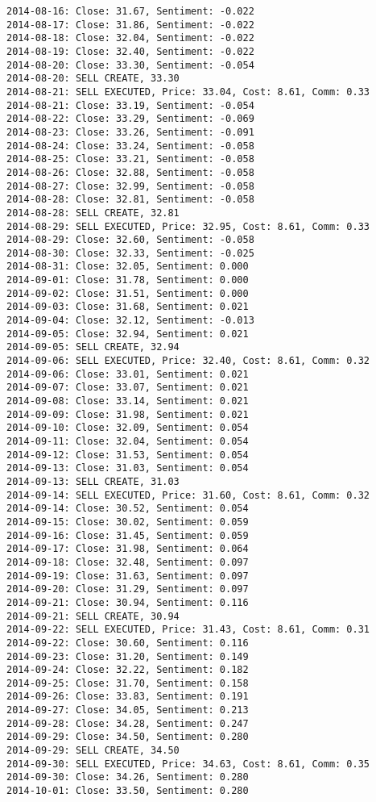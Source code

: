 \documentclass[11pt]{article}
\begin{document}
\begin{Verbatim}[commandchars=\\\{\}]
2014-08-16: Close: 31.67, Sentiment: -0.022
2014-08-17: Close: 31.86, Sentiment: -0.022
2014-08-18: Close: 32.04, Sentiment: -0.022
2014-08-19: Close: 32.40, Sentiment: -0.022
2014-08-20: Close: 33.30, Sentiment: -0.054
2014-08-20: SELL CREATE, 33.30
2014-08-21: SELL EXECUTED, Price: 33.04, Cost: 8.61, Comm: 0.33
2014-08-21: Close: 33.19, Sentiment: -0.054
2014-08-22: Close: 33.29, Sentiment: -0.069
2014-08-23: Close: 33.26, Sentiment: -0.091
2014-08-24: Close: 33.24, Sentiment: -0.058
2014-08-25: Close: 33.21, Sentiment: -0.058
2014-08-26: Close: 32.88, Sentiment: -0.058
2014-08-27: Close: 32.99, Sentiment: -0.058
2014-08-28: Close: 32.81, Sentiment: -0.058
2014-08-28: SELL CREATE, 32.81
2014-08-29: SELL EXECUTED, Price: 32.95, Cost: 8.61, Comm: 0.33
2014-08-29: Close: 32.60, Sentiment: -0.058
2014-08-30: Close: 32.33, Sentiment: -0.025
2014-08-31: Close: 32.05, Sentiment: 0.000
2014-09-01: Close: 31.78, Sentiment: 0.000
2014-09-02: Close: 31.51, Sentiment: 0.000
2014-09-03: Close: 31.68, Sentiment: 0.021
2014-09-04: Close: 32.12, Sentiment: -0.013
2014-09-05: Close: 32.94, Sentiment: 0.021
2014-09-05: SELL CREATE, 32.94
2014-09-06: SELL EXECUTED, Price: 32.40, Cost: 8.61, Comm: 0.32
2014-09-06: Close: 33.01, Sentiment: 0.021
2014-09-07: Close: 33.07, Sentiment: 0.021
2014-09-08: Close: 33.14, Sentiment: 0.021
2014-09-09: Close: 31.98, Sentiment: 0.021
2014-09-10: Close: 32.09, Sentiment: 0.054
2014-09-11: Close: 32.04, Sentiment: 0.054
2014-09-12: Close: 31.53, Sentiment: 0.054
2014-09-13: Close: 31.03, Sentiment: 0.054
2014-09-13: SELL CREATE, 31.03
2014-09-14: SELL EXECUTED, Price: 31.60, Cost: 8.61, Comm: 0.32
2014-09-14: Close: 30.52, Sentiment: 0.054
2014-09-15: Close: 30.02, Sentiment: 0.059
2014-09-16: Close: 31.45, Sentiment: 0.059
2014-09-17: Close: 31.98, Sentiment: 0.064
2014-09-18: Close: 32.48, Sentiment: 0.097
2014-09-19: Close: 31.63, Sentiment: 0.097
2014-09-20: Close: 31.29, Sentiment: 0.097
2014-09-21: Close: 30.94, Sentiment: 0.116
2014-09-21: SELL CREATE, 30.94
2014-09-22: SELL EXECUTED, Price: 31.43, Cost: 8.61, Comm: 0.31
2014-09-22: Close: 30.60, Sentiment: 0.116
2014-09-23: Close: 31.20, Sentiment: 0.149
2014-09-24: Close: 32.22, Sentiment: 0.182
2014-09-25: Close: 31.70, Sentiment: 0.158
2014-09-26: Close: 33.83, Sentiment: 0.191
2014-09-27: Close: 34.05, Sentiment: 0.213
2014-09-28: Close: 34.28, Sentiment: 0.247
2014-09-29: Close: 34.50, Sentiment: 0.280
2014-09-29: SELL CREATE, 34.50
2014-09-30: SELL EXECUTED, Price: 34.63, Cost: 8.61, Comm: 0.35
2014-09-30: Close: 34.26, Sentiment: 0.280
2014-10-01: Close: 33.50, Sentiment: 0.280

\end{Verbatim}
\end{document}
